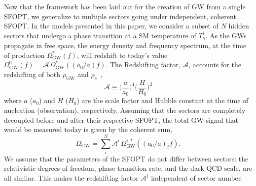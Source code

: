 \documentclass[nofootinbib,twocolumn,preprintnumbers]{revtex4-1}
\begin{document}
Now that the framework has been laid out for the creation of GW from a single SFOPT, we generalize to multiple sectors going under independent, coherent SFOPT. In the models presented in this paper, we consider a subset of $N$ hidden sectors that undergo a phase transition at a SM temperature of $T_{\gamma}^{i}$. As the GWs propagate in free space, the energy density and frequency spectrum, at the time of production $\Omega_{\textrm{GW}}^{*}(f)$, will redshift to today's value $\Omega_{\textrm{GW}}^{0}(f) = \mathcal{A}\, \Omega_{\textrm{GW}}^{*}((a_{0}/a) f) $. The Redshifting factor, $\mathcal{A}$, accounts for the redshifting of both $\rho_{\textrm{GW}} $ and $\rho_{c}$~\cite{Breitbach:2018ddu,PhysRevD.49.2837},
\begin{equation}\label{eqn::redshifting}
\mathcal{A} \equiv \bigg( \frac{a}{a_{0}} \bigg)^4 \bigg( \frac{H}{H_{0}}\bigg)^2
\end{equation}
where $a$ ($a_{0}$)  and $H$ ($H_{0}$) are the scale factor and Hubble constant at the time of nucleation (observation), respectively. Assuming that the sectors are completely decoupled before and after their respective SFOPT, the total GW signal that would be measured today is given by the coherent sum,
\begin{equation}
\Omega_{\textrm{GW}} =  \sum_{i}^{N} \mathcal{A}^{i}\, \Omega_{\textrm{GW}}^{i,*}((a_{0}/a)_{i} f) .
\end{equation}
We assume that the parameters of the SFOPT do not differ between sectors: the relativistic degrees of freedom, phase transition rate, and the dark QCD scale, are all similar. This makes the redshifting factor $\mathcal{A}^i$ independent of sector number.
\end{document}
